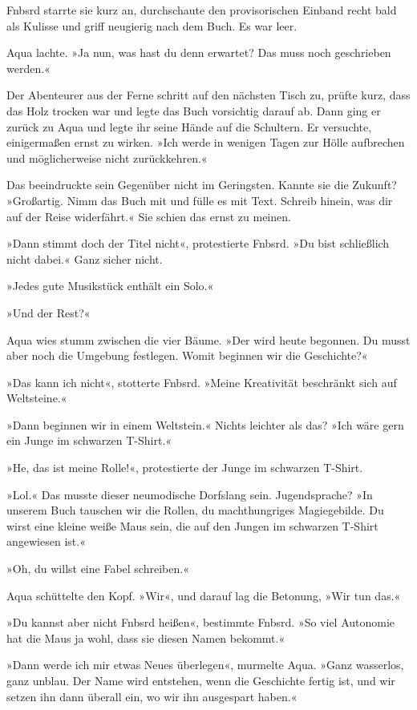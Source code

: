 Fnbsrd starrte sie kurz an, durchschaute den provisorischen Einband recht bald als Kulisse und griff neugierig nach dem Buch. Es war leer.

Aqua lachte. »Ja nun, was hast du denn erwartet? Das muss noch geschrieben werden.«

Der Abenteurer aus der Ferne schritt auf den nächsten Tisch zu, prüfte kurz, dass das Holz trocken war und legte das Buch vorsichtig darauf ab. Dann ging er zurück zu Aqua und legte ihr seine Hände auf die Schultern. Er versuchte, einigermaßen ernst zu wirken. »Ich werde in wenigen Tagen zur Hölle aufbrechen und möglicherweise nicht zurückkehren.«

Das beeindruckte sein Gegenüber nicht im Geringsten. Kannte sie die Zukunft? »Großartig. Nimm das Buch mit und fülle es mit Text. Schreib hinein, was dir auf der Reise widerfährt.« Sie schien das ernst zu meinen.

»Dann stimmt doch der Titel nicht«, protestierte Fnbsrd. »Du bist schließlich nicht dabei.« Ganz sicher nicht.

»Jedes gute Musikstück enthält ein Solo.«

»Und der Rest?«

Aqua wies stumm zwischen die vier Bäume. »Der wird heute begonnen. Du musst aber noch die Umgebung festlegen. Womit beginnen wir die Geschichte?«

»Das kann ich nicht«, stotterte Fnbsrd. »Meine Kreativität beschränkt sich auf Weltsteine.«

»Dann beginnen wir in einem Weltstein.« Nichts leichter als das? »Ich wäre gern ein Junge im schwarzen T-Shirt.«

»He, das ist meine Rolle!«, protestierte der Junge im schwarzen T-Shirt.

»Lol.« Das musste dieser neumodische Dorfslang sein. Jugendsprache? »In unserem Buch tauschen wir die Rollen, du machthungriges Magiegebilde. Du wirst eine kleine weiße Maus sein, die auf den Jungen im schwarzen T-Shirt angewiesen ist.«

»Oh, du willst eine Fabel schreiben.«

Aqua schüttelte den Kopf. »Wir«, und darauf lag die Betonung, »Wir tun das.«

»Du kannst aber nicht Fnbsrd heißen«, bestimmte Fnbsrd. »So viel Autonomie hat die Maus ja wohl, dass sie diesen Namen bekommt.«

»Dann werde ich mir etwas Neues überlegen«, murmelte Aqua. »Ganz wasserlos, ganz unblau. Der Name wird entstehen, wenn die Geschichte fertig ist, und wir setzen ihn dann überall ein, wo wir ihn ausgespart haben.«

